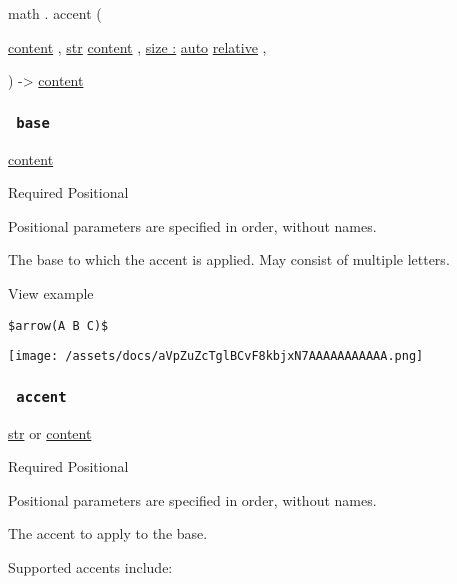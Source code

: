 math { . } { accent } (

{ \href{/docs/reference/foundations/content/}{content} , } {
\href{/docs/reference/foundations/str/}{str}
\href{/docs/reference/foundations/content/}{content} , } {
\hyperref[parameters-size]{size :}
\href{/docs/reference/foundations/auto/}{auto}
\href{/docs/reference/layout/relative/}{relative} , }

) -\textgreater{} \href{/docs/reference/foundations/content/}{content}

\subsubsection{\texorpdfstring{\texttt{\ base\ }}{ base }}\label{parameters-base}

\href{/docs/reference/foundations/content/}{content}

{Required} {{ Positional }}

\label{parameters-base-positional-tooltip}
Positional parameters are specified in order, without names.

The base to which the accent is applied. May consist of multiple
letters.


View example

\begin{verbatim}
$arrow(A B C)$
\end{verbatim}

\texttt{[image: /assets/docs/aVpZuZcTglBCvF8kbjxN7AAAAAAAAAAA.png]}

\subsubsection{\texorpdfstring{\texttt{\ accent\ }}{ accent }}\label{parameters-accent}

\href{/docs/reference/foundations/str/}{str} {or}
\href{/docs/reference/foundations/content/}{content}

{Required} {{ Positional }}

\label{parameters-accent-positional-tooltip}
Positional parameters are specified in order, without names.

The accent to apply to the base.

Supported accents include:

